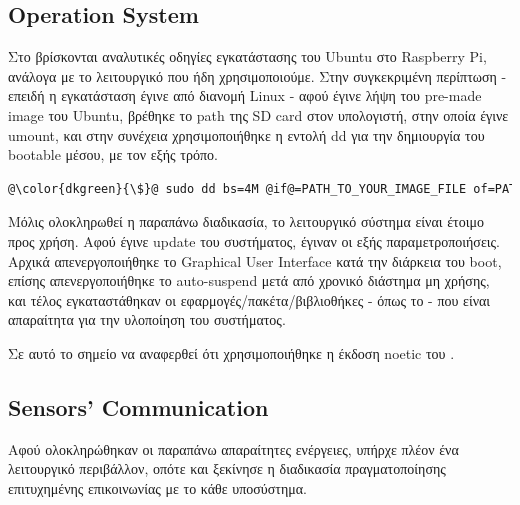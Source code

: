 \subsection{Operation System} 
Στο \cite{ubuntu-raspi-intall} βρίσκονται αναλυτικές οδηγίες εγκατάστασης του Ubuntu στο Ra\-spbe\-rry Pi, ανάλογα με το λειτουργικό που ήδη χρησιμοποιούμε. Στην συγκεκριμένη περίπτωση - επειδή η εγκατάσταση έγινε από διανομή Linux - αφού έγινε λήψη του pre-made image του Ubuntu, βρέθηκε το path της SD card στον υπολογιστή, στην οποία έγινε umount, και στην συνέχεια χρησιμοποιήθηκε η εντολή dd για την δημιουργία του bootable μέσου, με τον εξής τρόπο.

\begin{lstlisting}[language=sh, escapechar=@, caption={Create bootable SD from Linux},label=create-bootable-sd-terminal]
    @\color{dkgreen}{\$}@ sudo dd bs=4M @if@=PATH_TO_YOUR_IMAGE_FILE of=PATH_TO_YOUR_SD_CARD status=progress
\end{lstlisting}

Μόλις ολοκληρωθεί η παραπάνω διαδικασία, το λειτουργικό σύστημα είναι έτοιμο προς χρήση. Αφού έγινε update του συστήματος, έγιναν οι εξής παραμετροποιήσεις. Αρχικά απενεργοποιήθηκε το Graphical User Interface κατά την διάρκεια του boot, επίσης απενεργοποιήθηκε το auto-suspend μετά από χρονικό διάστημα μη χρήσης, και τέλος εγκαταστάθηκαν οι εφαρμογές/πακέτα/βιβλιοθήκες - όπως το  - που είναι απαραίτητα για την υλοποίηση του συστήματος. 

Σε αυτό το σημείο να αναφερθεί ότι χρησιμοποιήθηκε η έκδοση noetic του .


\subsection{Sensors' Communication} 
Αφού ολοκληρώθηκαν οι παραπάνω απαραίτητες ενέργειες, υπήρχε πλέον ένα λειτουργικό περιβάλλον, οπότε και ξεκίνησε η διαδικασία πραγματοποίησης ε\-πι\-τυ\-χη\-μέ\-νης επικοινωνίας με το κάθε υποσύστημα.

